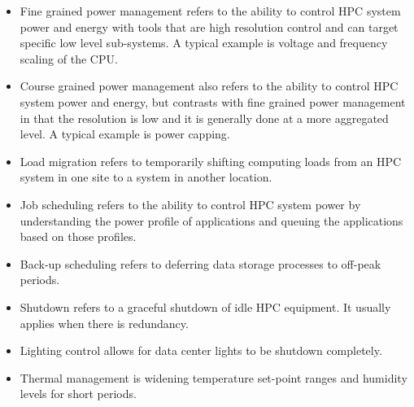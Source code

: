 \begin{itemize}
\item Fine grained power management refers to the ability to control HPC system power 
and energy with tools that are high resolution control and can target specific 
low level sub-systems. A typical example is voltage and frequency scaling of the CPU.

\item Course grained power management also refers to the ability to control HPC 
system power and energy, but contrasts with fine grained power management in 
that the resolution is low and it is generally done at a more aggregated level. 
A typical example is power capping.

\item Load migration refers to temporarily shifting computing loads from 
an HPC system in one site to a system in another location.

\item Job scheduling refers to the ability to control HPC system power 
by understanding the power profile of applications and queuing the 
applications based on those profiles.

\item Back-up scheduling refers to deferring data storage processes to off-peak periods.

\item Shutdown refers to a graceful shutdown of idle HPC equipment. It usually 
applies when there is redundancy.

\item Lighting control allows for data center lights to be shutdown completely.

\item Thermal management is widening temperature set-point ranges and 
humidity levels for short periods.
\end{itemize}


